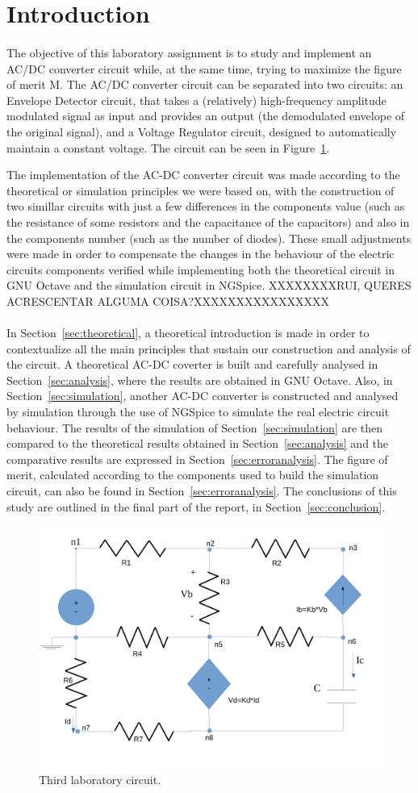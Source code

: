 \pagebreak

\section{Introduction}
\label{sec:introduction}

\paragraph{} 
The objective of this laboratory assignment is to study and implement an AC/DC converter circuit while, at the same time, trying to maximize the figure of merit M. The AC/DC converter circuit can be separated into two circuits: an Envelope Detector circuit, that takes a (relatively) high-frequency amplitude modulated signal as input and provides an output (the demodulated envelope of the original signal), and a Voltage Regulator circuit, designed to automatically maintain a constant voltage. The circuit can be seen in Figure~\ref{fig:circuit}.


The implementation of the AC-DC converter circuit was made according to the theoretical or simulation principles we were based on, with the construction of two simillar circuits with just a few differences in the components value (such as the resistance of some resistors and the capacitance of the capacitors) and also in the components number (such as the number of diodes). These small adjustments were made in order to compensate the changes in the behaviour of the electric circuits components verified while implementing both the theoretical circuit in GNU Octave and the simulation circuit in NGSpice.
XXXXXXXXRUI, QUERES ACRESCENTAR ALGUMA COISA?XXXXXXXXXXXXXXXX


\paragraph{}
In Section~\ref{sec:theoretical}, a theoretical introduction is made in order to contextualize all the main principles that sustain our construction and analysis of the circuit. A theoretical AC-DC coverter is built and carefully analysed in Section~\ref{sec:analysis}, where the results are obtained in GNU Octave. Also, in Section~\ref{sec:simulation}, another AC-DC converter is constructed and analysed by simulation through the use of NGSpice to simulate the real electric circuit behaviour. The results of the simulation of Section~\ref{sec:simulation} are then compared to the theoretical results obtained in Section~\ref{sec:analysis} and the comparative results are expressed in Section~\ref{sec:erroranalysis}. The figure of merit, calculated according to the components used to build the simulation circuit, can also be found in Section~\ref{sec:erroranalysis}. The conclusions of this study are outlined in the final part of the report, in Section~\ref{sec:conclusion}.


\begin{figure}[h] \centering
\includegraphics[width=0.4\linewidth]{circuit.pdf}
\caption{Third laboratory circuit.}
\label{fig:circuit}
\end{figure}

